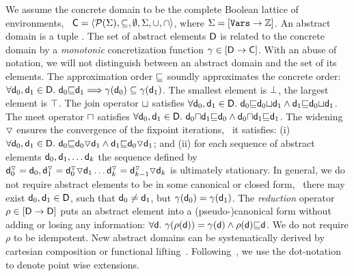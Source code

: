 \documentclass{llncs}
\begin{document}
We assume the concrete domain to be the complete Boolean lattice of environments, \ie\ $\mathsf{\mathsf{C}} =  \langle \mathcal{P}{(\Sigma)}, \subseteq, \emptyset, \Sigma, \cup, \cap \rangle$, where $\Sigma = [\mathtt{Vars} \rightarrow\mathbb{Z}]$.
An abstract domain  is a tuple .
The set of abstract elements $\mathsf{\mathsf{D}}$ is related to the concrete domain by a \emph{monotonic} concretization function $\gamma \in [\mathsf{\mathsf{D}} \rightarrow\mathsf{\mathsf{C}}]$.
With an abuse of notation, we will not distinguish between an abstract domain and the set of its elements.
The approximation order ${\sqsubseteq}$ soundly approximates  the concrete order: $\forall \ael{d}_0, \ael{d}_1 \in \adom{D}.\ \ael{d}_0 \aless \ael{d}_1 \Longrightarrow \gamma(\ael{d}_0) \subseteq \gamma(\ael{d}_1)$.
The smallest element is ${\bot}$, the largest element is  ${\top}$.
The join operator   ${\sqcup}$  satisfies $\forall \ael{d}_0, \ael{d}_1 \in \ael{D}.\ \ael{d}_0 \aless \ael{d}_0 \ajoin \ael{d}_1 \wedge 
\ael{d}_1 \aless \ael{d}_0 \ajoin \ael{d}_1$.
The meet operator ${\sqcap}$ satisfies  $\forall \ael{d}_0, \ael{d}_1 \in \ael{D}.\ \ael{d}_0 \ameet \ael{d}_1  \aless  \ael{d}_0 \wedge 
 \ael{d}_0 \ameet \ael{d}_1 \aless \ael{d}_1 $.
The widening  $\triangledown$ ensures the convergence of the fixpoint iterations, \ie\ it satisfies: (i) $ \forall \ael{d}_0, \ael{d}_1 \in \ael{D}.\ \ael{d}_0 \aless \ael{d}_0 \awidening \ael{d}_1 \wedge  \ael{d}_1 \aless \ael{d}_0 \awidening \ael{d}_1$; and (ii) for each sequence of abstract elements $\mathsf{\mathsf{d}}_0, \mathsf{\mathsf{d}}_1, \dots \mathsf{\mathsf{d}}_k $ the sequence defined by $\mathsf{\mathsf{d}}_0^{\triangledown} = \mathsf{\mathsf{d}}_0, \mathsf{\mathsf{d}}_1^{\triangledown} = \mathsf{\mathsf{d}}^{\triangledown}_0 \triangledown \mathsf{\mathsf{d}}_1  \dots \mathsf{\mathsf{d}}^{\triangledown}_k = \mathsf{\mathsf{d}}^{\triangledown}_{k-1} \triangledown \mathsf{\mathsf{d}}_{k} $  is ultimately stationary.
In general, we do not require abstract elements to be in some canonical or closed form, \ie\ there may exist $\mathsf{\mathsf{d}}_0, \mathsf{\mathsf{d}}_1 \in \mathsf{\mathsf{D}}$, such that $\mathsf{\mathsf{d}}_0 \neq \mathsf{\mathsf{d}}_1$, but $\gamma(\mathsf{\mathsf{d}}_0) = \gamma(\mathsf{\mathsf{d}}_1)$.
The \emph{reduction} operator $\rho \in [\mathsf{\mathsf{D}} \rightarrow\mathsf{\mathsf{D}}]$ puts an abstract element into a (pseudo-)canonical form without adding or losing any information: $\forall \mathsf{\mathsf{d}}.\  \gamma(\rho(\mathsf{\mathsf{d}})) = \gamma(\mathsf{\mathsf{d}}) \wedge \rho(\mathsf{\mathsf{d}}) {\sqsubseteq} \mathsf{\mathsf{d}}$. 
We do not require $\rho$ to be idempotent.
New abstract domains can be systematically derived by cartesian composition or functional lifting~\cite{CousotCousot79}. 
Following~\cite{Cousot98}, we use the dot-notation to denote point wise  extensions.
\end{document}
